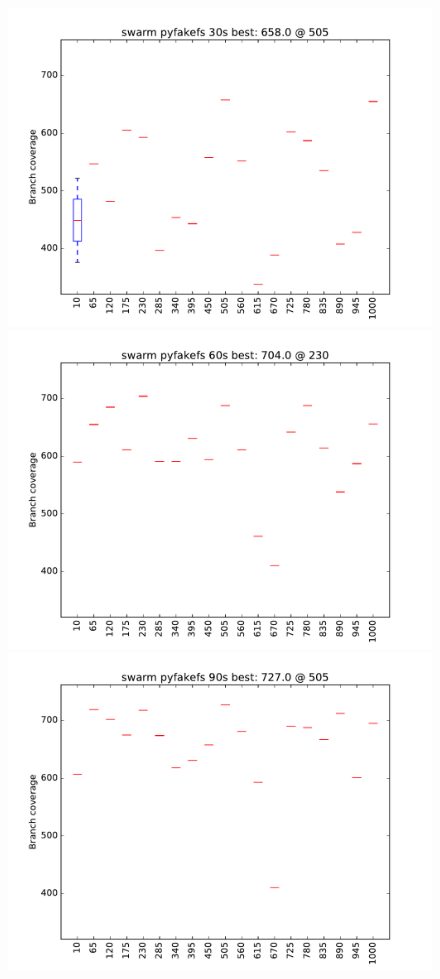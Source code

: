 \begin{figure}
\includegraphics[width=\columnwidth]{graphs/pyfakefsswarm30}
\includegraphics[width=\columnwidth]{graphs/pyfakefsswarm60}
\includegraphics[width=\columnwidth]{graphs/pyfakefsswarm90}
\end{figure}



